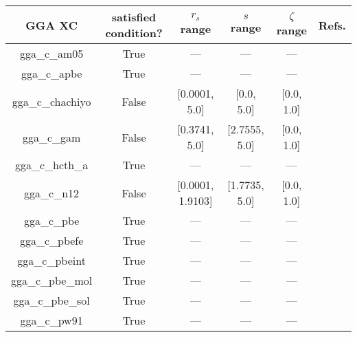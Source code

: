 \begin{tabular}{|c|c|c|c|c|l|}
\hline
          GGA XC &  satisfied condition? &      $r_s$ range &     $s$ range & $\zeta$ range  &                                                 Refs. \\ \hline
    gga\_c\_am05 &                  True &              --- &           --- &            --- &        \cite{Armiento2005_085108,Mattsson2008_084714} \\ \hline
    gga\_c\_apbe &                  True &              --- &           --- &            --- &                          \cite{Constantin2011_186406} \\ \hline
gga\_c\_chachiyo &                 False &    [0.0001, 5.0] &    [0.0, 5.0] &     [0.0, 1.0] &                            \cite{Chachiyo2020_112669} \\ \hline
     gga\_c\_gam &                 False &    [0.3741, 5.0] & [2.7555, 5.0] &     [0.0, 1.0] &                                   \cite{Yu2015_12146} \\ \hline
 gga\_c\_hcth\_a &                  True &              --- &           --- &            --- &                             \cite{Hamprecht1998_6264} \\ \hline
     gga\_c\_n12 &                 False & [0.0001, 1.9103] & [1.7735, 5.0] &     [0.0, 1.0] &                              \cite{Peverati2012_2310} \\ \hline
     gga\_c\_pbe &                  True &              --- &           --- &            --- &            \cite{Perdew1996_3865,Perdew1996_3865_err} \\ \hline
   gga\_c\_pbefe &                  True &              --- &           --- &            --- &                                 \cite{Perez2015_3844} \\ \hline
  gga\_c\_pbeint &                  True &              --- &           --- &            --- &                             \cite{Fabiano2010_113104} \\ \hline
gga\_c\_pbe\_mol &                  True &              --- &           --- &            --- &                            \cite{delCampo2012_104108} \\ \hline
gga\_c\_pbe\_sol &                  True &              --- &           --- &            --- &                              \cite{Perdew2008_136406} \\ \hline
    gga\_c\_pw91 &                  True &              --- &           --- &            --- & \cite{Perdew1991,Perdew1992_6671,Perdew1992_6671_err} \\ \hline

\end{tabular}
